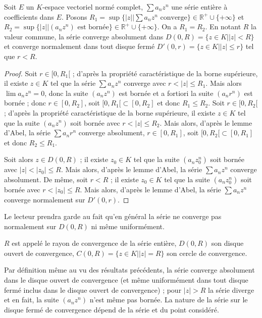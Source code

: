 \begin{thm}
Soit $E$ un $K$-espace vectoriel normé complet,
$\sum a_n z^n$ une série entière à coefficients dans $E$.
Posons $R_1 = \sup\{|z| | \sum a_n z^n \text{ converge}\} \in \mathbb{R}^+ \cup \{+\infty\}$ et $R_2 = \sup\{|z| | (a_n z^n) \text{ est bornée}\} \in \mathbb{R}^+ \cup \{+\infty\}$. On a $R_1 = R_2$. En notant $R$ la
valeur commune, la série converge absolument dans $D(0,R) = \{z \in K | |z| < R\}$ et converge normalement dans tout disque
fermé $D'(0,r) = \{z \in K | |z| \leq r\}$ tel que $r < R$.
\end{thm}

\begin{proof}
Soit $r \in [0,R_1[$ ; d'après la propriété
caractéristique de la borne supérieure, il existe $z \in K$ tel que la série
$\sum a_n z^n$ converge avec $r < |z| \leq R_1$. Mais alors
$\lim a_n z^n = 0$, donc la
suite $(a_n z^n)$ est bornée et a fortiori la suite
$(a_n r^n)$ est bornée ; donc $r \in [0,R_2]$,
soit $[0,R_1[ \subset [0,R_2]$ et donc $R_1 \leq R_2$. Soit $r \in [0,R_2[$ ; d'après la propriété
caractéristique de la borne supérieure, il existe $z \in K$ tel que la suite
$(a_n z^n)$ soit bornée avec $r < |z| \leq R_2$. Mais alors, d'après le lemme
d'Abel, la série $\sum a_n r^n$ converge absolument, $r \in [0,R_1]$, soit $[0,R_2[ \subset [0,R_1]$ et
donc $R_2 \leq R_1$.

Soit alors $z \in D(0,R)$ ; il existe $z_0 \in K$ tel que la suite
$(a_n z_0^n)$ soit bornée avec
$|z| < |z_0| \leq R$.
Mais alors, d'après le lemme d'Abel, la série
$\sum a_n z^n$ converge absolument. De même, soit $r < R$ ; il existe $z_0 \in K$ tel que la suite
$(a_n z_0^n)$ soit bornée avec $r < |z_0| \leq R$. Mais alors, d'après le lemme
d'Abel, la série $\sum a_n z^n$ converge normalement sur $D'(0,r)$.
\end{proof}

\begin{rem}
Le lecteur prendra garde au fait qu'en général la série
ne converge pas normalement sur $D(0,R)$ ni même uniformément.
\end{rem}

\begin{de}
$R$ est appelé le rayon de convergence de la série
entière, $D(0,R)$ son disque ouvert de convergence, $C(0,R) = \{z \in K | |z| = R\}$ son cercle de convergence.
\end{de}

\begin{rem}
Par définition même au vu des résultats précédents, la
série converge absolument dans le disque ouvert de convergence (et même
uniformément dans tout disque fermé inclus dans le disque ouvert de
convergence) ; pour $|z| > R$ la série diverge et en fait, la suite $(a_n z^n)$ n'est même pas
bornée. La nature de la série sur le disque fermé de convergence dépend
de la série et du point considéré.
\end{rem}

